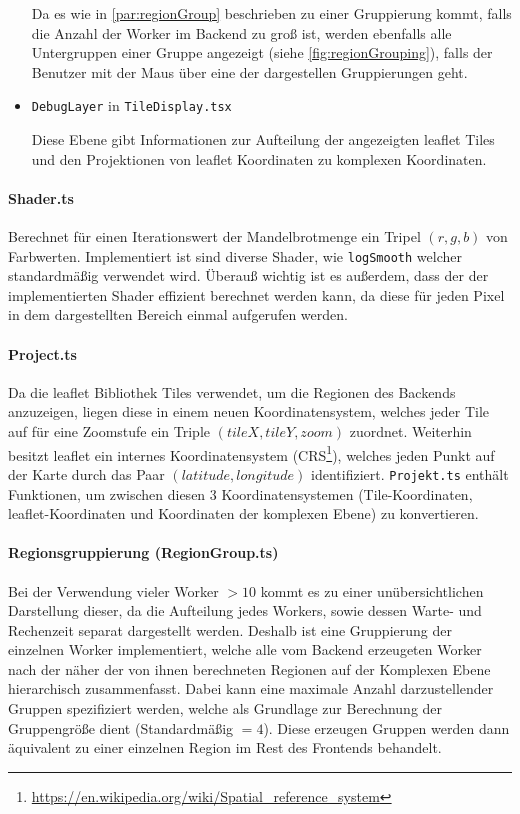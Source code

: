 \begin{itemize}
	      Da es wie in \autoref{par:regionGroup} beschrieben zu einer Gruppierung kommt, falls die Anzahl der Worker im Backend zu
	      groß ist, werden ebenfalls alle Untergruppen einer Gruppe angezeigt (siehe \autoref{fig:regionGrouping}), falls der Benutzer mit der Maus über eine der
	      dargestellen Gruppierungen geht.
	\item \verb|DebugLayer| in \verb|TileDisplay.tsx|

	      Diese Ebene gibt Informationen zur Aufteilung der angezeigten leaflet Tiles und den Projektionen von
	      leaflet Koordinaten zu komplexen Koordinaten.
\end{itemize}

\paragraph{Shader.ts}\label{par:shader}
Berechnet für einen Iterationswert der Mandelbrotmenge ein Tripel \( (r,g,b) \) von Farbwerten.
Implementiert ist sind diverse Shader, wie \verb|logSmooth| welcher standardmäßig verwendet wird.
Überauß wichtig ist es außerdem, dass der der implementierten Shader effizient berechnet werden kann, da diese
für jeden Pixel in dem dargestellten Bereich einmal aufgerufen werden.

\paragraph{Project.ts}
Da die leaflet Bibliothek Tiles verwendet, um die Regionen des Backends anzuzeigen, liegen diese in
einem neuen Koordinatensystem, welches jeder Tile auf für eine Zoomstufe ein Triple \( (tileX, tileY, zoom) \) zuordnet.
Weiterhin besitzt leaflet ein internes Koordinatensystem (CRS\footnote{\url{https://en.wikipedia.org/wiki/Spatial_reference_system}}),
welches jeden Punkt auf der Karte durch das Paar \( (latitude, longitude) \) identifiziert.
\verb|Projekt.ts| enthält Funktionen, um zwischen diesen 3 Koordinatensystemen
(Tile-Koordinaten, leaflet-Koordinaten und Koordinaten der komplexen Ebene) zu konvertieren.

\paragraph{Regionsgruppierung (RegionGroup.ts)}\label{par:regionGroup}
Bei der Verwendung vieler Worker \( > 10 \) kommt es zu einer unübersichtlichen Darstellung
dieser, da die Aufteilung jedes Workers, sowie dessen Warte- und Rechenzeit separat dargestellt werden.
Deshalb ist eine Gruppierung der einzelnen Worker implementiert, welche alle vom Backend erzeugeten Worker
nach der näher der von ihnen berechneten Regionen auf der Komplexen Ebene hierarchisch zusammenfasst. Dabei kann eine maximale
Anzahl darzustellender Gruppen spezifiziert werden, welche als Grundlage zur Berechnung der Gruppengröße dient (Standardmäßig \( = 4 \)).
Diese erzeugen Gruppen werden dann äquivalent zu einer einzelnen Region im Rest des Frontends behandelt.


